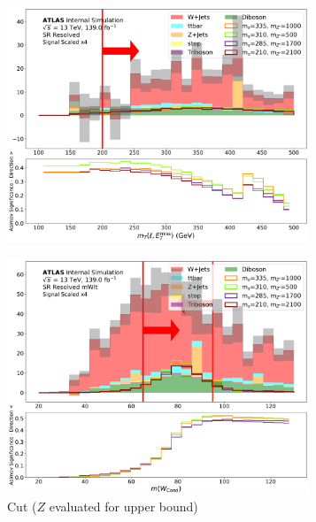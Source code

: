   \begin{figure}[htbp]
  \centering
    \begin{subfigure}[t]{0.48\textwidth}
    \centering
     \includegraphics[width = 0.99\textwidth]{Figures/5/SR1L_Resolved/mT_lep_met_N_1.pdf}
    \caption{\mtlepmet}
    \end{subfigure}
    \begin{subfigure}[t]{0.48\textwidth}
    \centering
     \includegraphics[width = 0.99\textwidth]{Figures/5/SR1L_Resolved_mWlt/WCand_m_N_1.pdf}
     \caption{\Wcandm Cut (\(Z\) evaluated for upper bound)}
    \end{subfigure}
    \begin{subfigure}[t]{0.48\textwidth}

\end{subfigure}
\end{figure}
